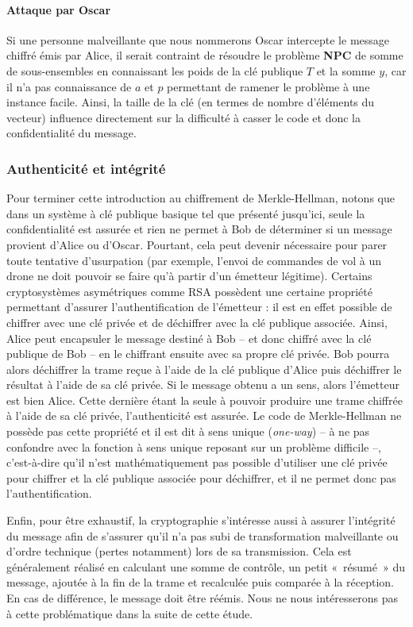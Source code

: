 \documentclass[a4paper,10pt]{article}
\begin{document}
\paragraph{Attaque par Oscar}  Si une personne malveillante que nous nommerons Oscar intercepte le message chiffré émis par Alice, il serait contraint de résoudre le problème \textbf{NPC} de somme de sous-ensembles en connaissant les poids de la clé publique $T$ et la somme $y$, car il n'a pas connaissance de $a$ et $p$ permettant de ramener le problème à une instance facile. Ainsi, la taille de la clé (en termes de nombre d'éléments du vecteur) influence directement sur la difficulté à casser le code et donc la confidentialité du message.

\subsubsection{Authenticité et intégrité}

Pour terminer cette introduction au chiffrement de Merkle-Hellman, notons que dans un système à clé publique basique tel que présenté jusqu'ici, seule la confidentialité est assurée et rien ne permet à Bob de déterminer si un message provient d'Alice ou d'Oscar. Pourtant, cela peut devenir nécessaire pour parer toute tentative d'usurpation (par exemple, l'envoi de commandes de vol à un drone ne doit pouvoir se faire qu'à partir d'un émetteur légitime). Certains cryptosystèmes asymétriques comme RSA possèdent une certaine propriété permettant d'assurer l'authentification de l'émetteur : il est en effet possible de chiffrer avec une clé privée et de déchiffrer avec la clé publique associée. Ainsi, Alice peut encapsuler le message destiné à Bob – et donc chiffré avec la clé publique de Bob – en le chiffrant ensuite avec sa propre clé privée. Bob pourra alors déchiffrer la trame reçue à l'aide de la clé publique d'Alice puis déchiffrer le résultat à l'aide de sa clé privée. Si le message obtenu a un sens, alors l'émetteur est bien Alice. Cette dernière étant la seule à pouvoir produire une trame chiffrée à l'aide de sa clé privée, l'authenticité est assurée. Le code de Merkle-Hellman ne possède pas cette propriété et il est dit à sens unique (\textit{one-way}) – à ne pas confondre avec la fonction à sens unique reposant sur un problème difficile –, c'est-à-dire qu'il n'est mathématiquement pas possible d'utiliser une clé privée pour chiffrer et la clé publique associée pour déchiffrer, et il ne permet donc pas l'authentification.

Enfin, pour être exhaustif, la cryptographie s'intéresse aussi à assurer l'intégrité du message afin de s'assurer qu'il n'a pas subi de transformation malveillante ou d'ordre technique (pertes notamment) lors de sa transmission. Cela est généralement réalisé en calculant une somme de contrôle, un petit «~résumé~» du message, ajoutée à la fin de la trame et recalculée puis comparée à la réception. En cas de différence, le message doit être réémis. Nous ne nous intéresserons pas à cette problématique dans la suite de cette étude.
\end{document}
